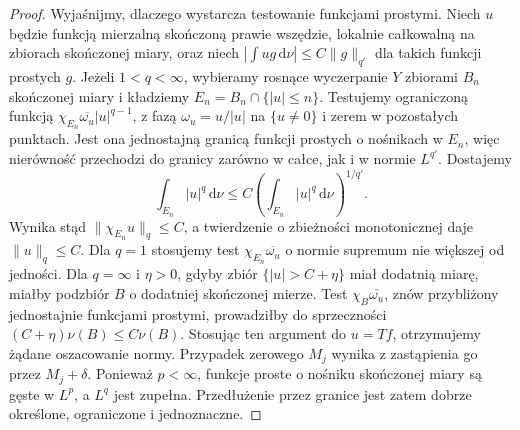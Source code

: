 \begin{proof}
Wyjaśnijmy, dlaczego wystarcza testowanie funkcjami
prostymi. Niech $u$ będzie funkcją mierzalną skończoną
prawie wszędzie, lokalnie całkowalną na zbiorach
skończonej miary, oraz niech
$|\int ug\,\mathrm d\nu|\le C\|g\|_{q'}$ dla takich
funkcji prostych $g$. Jeżeli $1<q<\infty$, wybieramy
rosnące wyczerpanie $Y$ zbiorami $B_n$ skończonej miary
i kładziemy $E_n=B_n\cap\{|u|\le n\}$. Testujemy
ograniczoną funkcją
$\chi_{E_n}\overline{\omega_u}|u|^{q-1}$, z fazą
$\omega_u=u/|u|$ na $\{u\ne0\}$ i zerem w pozostałych
punktach. Jest ona jednostajną granicą funkcji prostych
o nośnikach w $E_n$, więc nierówność przechodzi do
granicy zarówno w całce, jak i w normie $L^{q'}$.
Dostajemy
\[
 \int_{E_n}|u|^q\,\mathrm d\nu
 \le C\left(\int_{E_n}|u|^q\,\mathrm d\nu\right)^{1/q'}.
\]
Wynika stąd $\|\chi_{E_n}u\|_q\le C$, a twierdzenie
o zbieżności monotonicznej daje $\|u\|_q\le C$.
Dla $q=1$ stosujemy test $\chi_{E_n}\overline{\omega_u}$
o normie supremum nie większej od jedności.
Dla $q=\infty$ i $\eta>0$, gdyby zbiór
$\{|u|>C+\eta\}$ miał dodatnią miarę, miałby podzbiór
$B$ o dodatniej skończonej mierze. Test
$\chi_B\overline{\omega_u}$, znów przybliżony jednostajnie
funkcjami prostymi, prowadziłby do sprzeczności
$(C+\eta)\nu(B)\le C\nu(B)$.
Stosując ten argument do $u=Tf$, otrzymujemy żądane
oszacowanie normy. Przypadek zerowego $M_j$ wynika
z zastąpienia go przez $M_j+\delta$.
Ponieważ $p<\infty$, funkcje proste o nośniku skończonej
miary są gęste w $L^p$, a $L^q$ jest zupełna.
Przedłużenie przez granice jest zatem dobrze określone,
ograniczone i jednoznaczne.
\end{proof}

